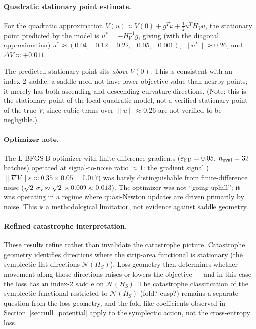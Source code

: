 \documentclass[11pt]{amsart}
\begin{document}
\paragraph{Quadratic stationary point estimate.}

For the quadratic approximation
$V(u) \approx V(0) + g^Tu + \tfrac{1}{2}u^TH_V u$,
the stationary point predicted by the model is $u^* = -H_V^{-1}g$,
giving (with the diagonal approximation)
$u^* \approx (0.04, -0.12, -0.22, -0.05, -0.001)$,
$\|u^*\| \approx 0.26$, and $\Delta V \approx +0.011$.

The predicted stationary point sits \emph{above} $V(0)$.
This is consistent with an index-2 saddle: a saddle need not have
lower objective value than nearby points; it merely has both ascending
and descending curvature directions.
(Note: this is the stationary point of the local quadratic model,
not a verified stationary point of the true $V$, since cubic terms
over $\|u\|\approx 0.26$ are not verified to be negligible.)

\paragraph{Optimizer note.}

The L-BFGS-B optimizer with finite-difference gradients
($\varepsilon_{\rm FD} = 0.05$, $n_{\rm eval} = 32$ batches) operated
at signal-to-noise ratio $\approx 1$:
the gradient signal ($\|\nabla V\|\varepsilon \approx 0.35 \times 0.05 = 0.017$)
was barely distinguishable from finite-difference noise
($\sqrt{2}\,\sigma_V \approx \sqrt{2} \times 0.009 \approx 0.013$).
The optimizer was not ``going uphill''; it was operating in a regime
where quasi-Newton updates are driven primarily by noise.
This is a methodological limitation, not evidence against saddle geometry.

\paragraph{Refined catastrophe interpretation.}

These results refine rather than invalidate the catastrophe picture.
Catastrophe geometry identifies directions where the strip-area
functional is stationary (the symplectic-flat directions $\mathcal{N}(H_S)$).
Loss geometry then determines whether movement along those directions
raises or lowers the objective --- and in this case the loss has an index-2
saddle on $\mathcal{N}(H_S)$.
The catastrophe classification of the symplectic functional restricted
to $\mathcal{N}(H_S)$ (fold? cusp?) remains a separate question from
the loss geometry, and the fold-like coefficients observed in
Section~\ref{sec:null_potential} apply to the symplectic action,
not the cross-entropy loss.
\end{document}
